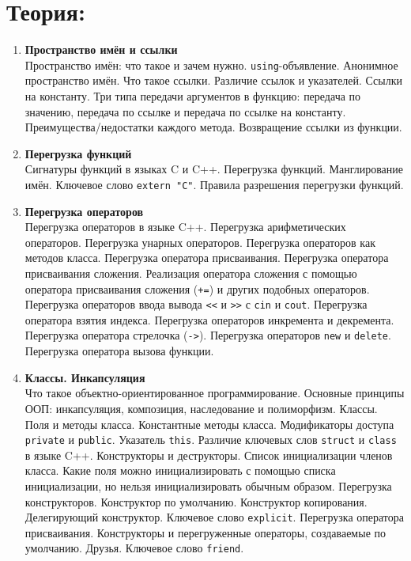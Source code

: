 \documentclass{article}
\begin{document}

\section*{Теория:}
\begin{enumerate}

\section*{Часть 1:}

\item \textbf{Пространство имён и ссылки}\\
Пространство имён: что такое и зачем нужно. \texttt{using}-объявление. Анонимное пространство имён. Что такое ссылки. Различие ссылок и указателей. Ссылки на константу. Три типа передачи аргументов в функцию: передача по значению, передача по ссылке и передача по ссылке на константу. Преимущества/недостатки каждого метода. Возвращение ссылки из функции.   



\item  \textbf{Перегрузка функций}\\
Сигнатуры функций в языках C и C++. Перегрузка функций. Манглирование имён. Ключевое слово \texttt{extern "C"}. Правила разрешения перегрузки функций. 


\item \textbf{Перегрузка операторов}\\
Перегрузка операторов в языке C++. Перегрузка арифметических операторов. Перегрузка унарных операторов. Перегрузка операторов как методов класса. Перегрузка оператора присваивания. Перегрузка оператора присваивания сложения. Реализация оператора сложения с помощью оператора присваивания сложения (\texttt{+=}) и других подобных операторов. Перегрузка операторов ввода вывода \verb|<<| и \verb|>>| с \texttt{cin} и \texttt{cout}. Перегрузка оператора взятия индекса. Перегрузка операторов инкремента и декремента. Перегрузка оператора стрелочка (\texttt{->}). Перегрузка операторов \texttt{new} и \texttt{delete}. Перегрузка оператора вызова функции.

\item  \textbf{Классы. Инкапсуляция}\\
Что такое объектно-ориентированное программирование. Основные принципы ООП: инкапсуляция, композиция, наследование и полиморфизм. Классы. Поля и методы класса. Константные методы класса. Модификаторы доступа \texttt{private} и \texttt{public}.  Указатель \texttt{this}.  Различие ключевых слов \texttt{struct} и \texttt{class} в языке C++. Конструкторы и деструкторы. Список инициализации членов класса. Какие поля можно инициализировать с помощью списка инициализации, но нельзя инициализировать обычным образом. Перегрузка конструкторов. Конструктор по умолчанию. Конструктор копирования. Делегирующий конструктор. Ключевое слово \texttt{explicit}. Перегрузка оператора присваивания. Конструкторы и перегруженные операторы, создаваемые по умолчанию.
Друзья. Ключевое слово \texttt{friend}. 


\end{enumerate}
\end{document}
